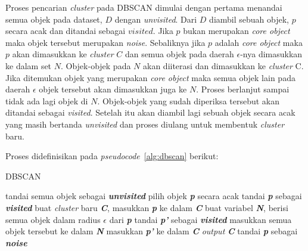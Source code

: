 Proses pencarian \textit{cluster} pada DBSCAN dimulai dengan pertama menandai semua objek pada dataset, $D$ dengan \textit{unvisited}. Dari $D$ diambil sebuah objek, $p$ secara acak dan ditandai sebagai $visited$. Jika $p$ bukan merupakan \textit{core object} maka objek tersebut merupakan \textit{noise}. Sebaliknya jika $p$ adalah \textit{core object} maka $p$ akan dimasukkan ke \textit{cluster} $C$ dan semua objek pada daerah $\epsilon$-nya dimasukkan ke dalam set $N$. Objek-objek pada $N$ akan diiterasi dan dimasukkan ke \textit{cluster} C. Jika ditemukan objek yang merupakan \textit{core object} maka semua objek lain pada daerah $\epsilon$ objek tersebut akan dimasukkan juga ke $N$. Proses berlanjut sampai tidak ada lagi objek di $N$. Objek-objek yang sudah diperiksa tersebut akan ditandai sebagai \textit{visited}. Setelah itu akan diambil lagi sebuah objek secara acak yang masih bertanda \textit{unvisited} dan proses diulang untuk membentuk \textit{cluster} baru.

Proses didefinisikan pada \textit{pseudocode}~\ref{alg:dbscan} berikut: \\
\begin{algorithm}[H]
	\caption{DBSCAN}
	\label{alg:dbscan}
	\begin{algorithmic}[1]
		\STATE tandai semua objek sebagai \textit{\textbf{unvisited}}
		\STATE pilih objek \textit{\textbf{p}} secara acak
		\STATE tandai \textit{\textbf{p}} sebagai \textit{\textbf{visited}}
		\STATE buat \textit{cluster} baru \textit{\textbf{C}}, masukkan \textit{\textbf{p}} ke dalam \textit{\textbf{C}}
		\STATE buat variabel \textit{\textbf{N}}, berisi semua objek dalam radius $\epsilon$ dari \textit{\textbf{p}}
		\STATE tandai \textit{\textbf{p'}} sebagai \textit{\textbf{visited}}
		\STATE masukkan semua objek tersebut ke dalam \textit{\textbf{N}}
		\ENDIF
		\STATE masukkan \textit{\textbf{p'}} ke dalam \textit{\textbf{C}}
		\ENDIF
		\ENDIF
		\ENDFOR
		\STATE \textit{output} \textit{\textbf{C}}
		\ELSE
		\STATE tandai \textit{\textbf{p}} sebagai \textit{\textbf{noise}}
		\ENDIF
		\ENDWHILE
	\end{algorithmic}
\end{algorithm}
 